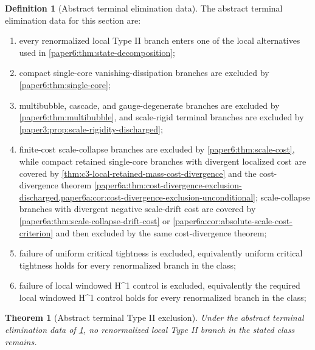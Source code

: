 \documentclass[11pt]{amsart}
\def\({}%
\def\){}%
\theoremstyle{plain}
\newtheorem{theorem}{Theorem}[section]
\theoremstyle{definition}
\newtheorem{definition}[definition]{Definition}
\theoremstyle{remark}
\begin{document}
\begin{definition}[Abstract terminal elimination data]\label{paper6a:def:abstract-final-data}
The abstract terminal elimination data for this section are:
\begin{enumerate}[label=\textup{(\roman*)}]
\item every renormalized local Type II branch enters one of the local
alternatives used in \cref{paper6:thm:state-decomposition};
\item compact single-core vanishing-dissipation branches are excluded by
\cref{paper6:thm:single-core};
\item multibubble, cascade, and gauge-degenerate branches are excluded by
\cref{paper6:thm:multibubble}, and scale-rigid terminal branches are excluded by
\cref{paper3:prop:scale-rigidity-discharged};
\item finite-cost scale-collapse branches are excluded by
\cref{paper6:thm:scale-cost}, while compact retained single-core branches with
divergent localized cost are covered by
\cref{thm:c3-local-retained-mass-cost-divergence} and the cost-divergence
theorem
\cref{paper6a:thm:cost-divergence-exclusion-discharged,paper6a:cor:cost-divergence-exclusion-unconditional};
scale-collapse branches with divergent negative scale-drift cost are covered by
\cref{paper6a:thm:scale-collapse-drift-cost} or
\cref{paper6a:cor:absolute-scale-cost-criterion} and then excluded by the same
cost-divergence theorem;
\item failure of uniform critical tightness is excluded, equivalently uniform critical
tightness holds for every renormalized branch in the class;
\item failure of local windowed \(H^1\) control is excluded, equivalently the required local
windowed \(H^1\) control holds for every renormalized branch in the class;
\end{enumerate}
\end{definition}

\begin{theorem}[Abstract terminal Type II exclusion]
\label{paper6a:thm:abstract-final-typeII}
Under the abstract terminal elimination data of
\cref{paper6a:def:abstract-final-data}, no renormalized local Type II branch in
the stated class remains.
\end{theorem}
\end{document}
